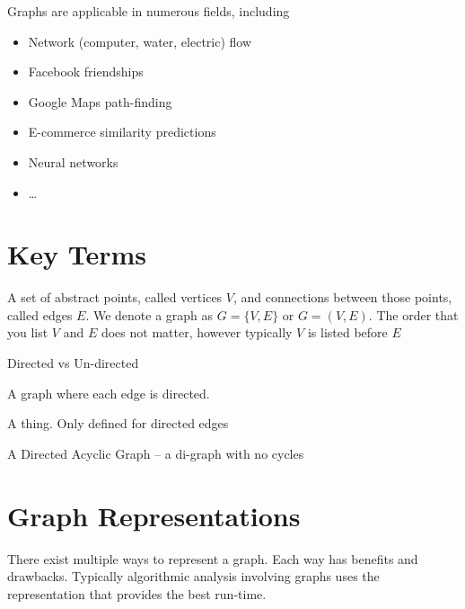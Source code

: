 \documentclass[main.tex]{subfiles}
\begin{document}
Graphs are applicable in numerous fields, including
\begin{itemize}
	\item Network (computer, water, electric) flow
	\item Facebook friendships
	\item Google Maps path-finding
	\item E-commerce similarity predictions
	\item Neural networks
	\item \dots
\end{itemize}

\section{Key Terms}

\begin{defn}
	A set of abstract points, called vertices \(V\), and connections between those points, called edges \(E\). We denote a graph as \(G = \{V, E\}\) or \(G = (V, E)\). The order that you list \(V\) and \(E\) does not matter, however typically \(V\) is listed before \(E\)
\end{defn}

\begin{defn}[Vertex]

\end{defn}

\begin{defn}[Edge]
	Directed vs Un-directed
\end{defn}

\begin{defn}[Di-graph]
	A graph where each edge is directed.
\end{defn}

\begin{defn}[Cycle]
	A thing. Only defined for directed edges
\end{defn}

\begin{defn}[DAG]
	A Directed Acyclic Graph -- a di-graph with no cycles
\end{defn}

\section{Graph Representations}

There exist multiple ways to represent a graph. Each way has benefits and drawbacks. Typically algorithmic analysis involving graphs uses the representation that provides the best run-time.
\end{document}
